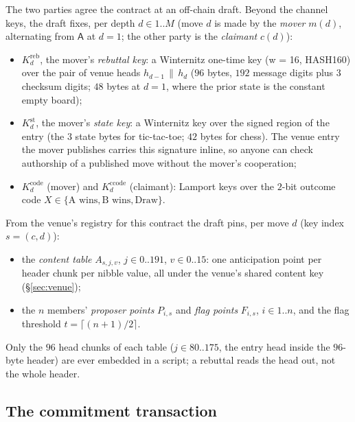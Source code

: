 \documentclass[11pt]{article}
\newcommand{\Pa}{\mathsf{A}}
\begin{document}
The two parties agree the contract at an off-chain draft. Beyond the
channel keys, the draft fixes, per depth $d \in 1..M$ (move $d$ is made
by the \emph{mover} $m(d)$, alternating from $\Pa$ at $d=1$; the other
party is the \emph{claimant} $c(d)$):
\begin{itemize}
\item $K^{\mathrm{reb}}_d$, the mover's \emph{rebuttal key}: a Winternitz
  one-time key (w = 16, HASH160) over the pair of venue heads
  $h_{d-1}\,\|\,h_d$ ($96$ bytes, $192$ message digits plus $3$ checksum
  digits; $48$ bytes at $d=1$, where the prior state is the constant
  empty board);
\item $K^{\mathrm{st}}_d$, the mover's \emph{state key}: a Winternitz
  key over the signed region of the entry (the $3$ state bytes for
  tic-tac-toe; $42$ bytes for chess). The venue entry the mover
  publishes carries this signature inline, so anyone can check
  authorship of a published move without the mover's cooperation;
\item $K^{\mathrm{code}}_d$ (mover) and $K^{\mathrm{ccode}}_d$
  (claimant): Lamport keys over the $2$-bit outcome code $X \in \{\text{A wins},
  \text{B wins}, \text{Draw}\}$.
\end{itemize}
From the venue's registry for this contract the draft pins, per move
$d$ (key index $s = (c, d)$):
\begin{itemize}
\item the \emph{content table} $A_{s,j,v}$, $j \in 0..191$, $v \in
  0..15$: one anticipation point per header chunk per nibble value, all
  under the venue's shared content key (\S\ref{sec:venue});
\item the $n$ members' \emph{proposer points} $P_{i,s}$ and \emph{flag
  points} $F_{i,s}$, $i \in 1..n$, and the flag threshold
  $t = \lceil (n+1)/2 \rceil$.
\end{itemize}
Only the $96$ head chunks of each table ($j \in 80..175$, the entry head
inside the $96$-byte header) are ever embedded in a script; a rebuttal
reads the head out, not the whole header.

\subsection{The commitment transaction}
\label{sec:graph:commit}
\end{document}
